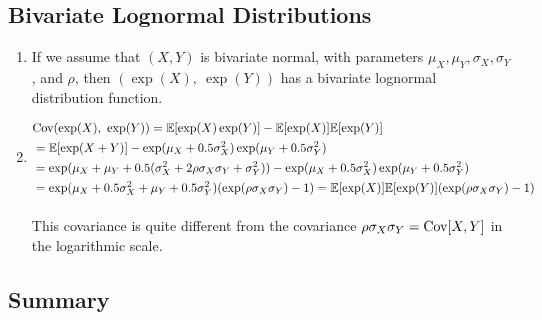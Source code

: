 \subsection{Bivariate Lognormal Distributions}

\begin{enumerate}
    \item  If we assume that $(X, Y)$ is bivariate normal, with parameters $\mu_X , \mu_Y , \sigma_X , \sigma_Y$ , and $\rho$, then $(\exp(X),\ \exp(Y ))$ has a bivariate lognormal distribution function.
    \hfill \cite{statistics/book/Statistics-for-Data-Scientists/Maurits-Kaptein}

    \item 
    $
        \begin{aligned}
            &\text{Cov}(\exp(X),\ \exp(Y )) 
            = \mathbb{E}[\exp(X) \exp(Y )] - \mathbb{E}[\exp(X)]\mathbb{E}[\exp(Y )] \\
            &= \mathbb{E}[\exp(X + Y )] - \exp(\mu_X + 0.5\sigma^2_X ) \exp(\mu_Y + 0.5\sigma^2_Y ) \\
            &= \exp(\mu_X + \mu_Y + 0.5(\sigma^2_X + 2\rho\sigma_X \sigma_Y + \sigma^2_Y )) - \exp(\mu_X + 0.5\sigma^2_X ) \exp(\mu_Y + 0.5\sigma^2_Y )\\
            &= \exp(\mu_X + 0.5\sigma^2_X + \mu_Y + 0.5\sigma^2_Y )(\exp(\rho\sigma_X \sigma_Y ) - 1)
            = \mathbb{E}[\exp(X)]\mathbb{E}[\exp(Y )](\exp(\rho\sigma_X \sigma_Y ) - 1)
        \end{aligned}
    $
    \hfill \cite{statistics/book/Statistics-for-Data-Scientists/Maurits-Kaptein}
    \\
    This covariance is quite different from the covariance $\rho \sigma_X \sigma_Y = \text{Cov}[X, Y] $ in the logarithmic scale.
    \hfill \cite{statistics/book/Statistics-for-Data-Scientists/Maurits-Kaptein}
\end{enumerate}



\subsection{Summary}

